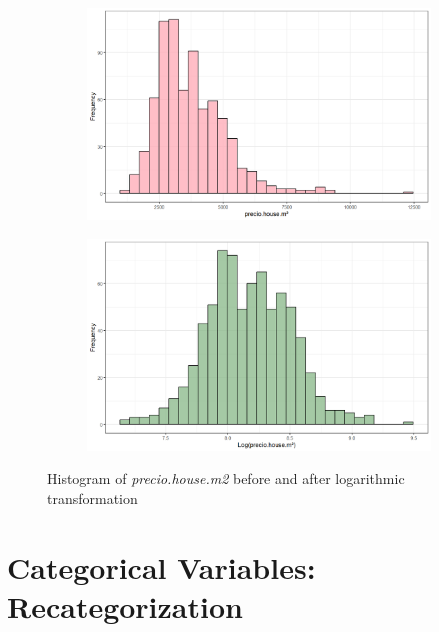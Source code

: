 \documentclass[11pt]{report} %
\begin{document}
\begin{figure}[h!]
    \centering
    \begin{subfigure}[b]{0.45\textwidth}
        \centering
        \includegraphics[width=\textwidth]{Images/Hist_price.png}
    \end{subfigure}
    \hfill
    \begin{subfigure}[b]{0.45\textwidth}
        \centering
        \includegraphics[width=\textwidth]{Images/Hist_log_price.png}
    \end{subfigure}
    \caption{Histogram of \textit{precio.house.m2} before and after logarithmic transformation}
    \label{fig:Hist_log_price}
\end{figure}


 
\section{Categorical Variables: Recategorization}
\end{document}
